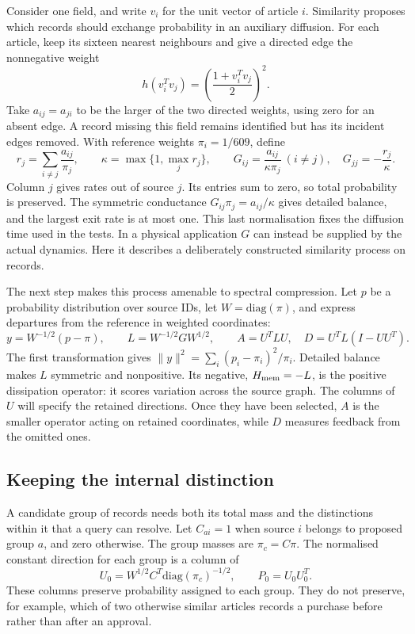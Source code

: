 Consider one field, and write $v_i$ for the unit vector of article $i$. Similarity proposes which records should exchange probability in an auxiliary diffusion. For each article, keep its sixteen nearest neighbours and give a directed edge the nonnegative weight
\[
 h(v_i^Tv_j)=\left(\frac{1+v_i^Tv_j}{2}\right)^2.
\]
Take $a_{ij}=a_{ji}$ to be the larger of the two directed weights, using zero for an absent edge. A record missing this field remains identified but has its incident edges removed. With reference weights $\pi_i=1/609$, define
\begin{equation}
 r_j=\sum_{i\ne j}\frac{a_{ij}}{\pi_j},\qquad
 \kappa=\max\{1,\max_j r_j\},\qquad
 G_{ij}=\frac{a_{ij}}{\kappa\pi_j}\ (i\ne j),\quad
 G_{jj}=-\frac{r_j}{\kappa}.
 \label{eq:memory-generator-construction}
\end{equation}
Column $j$ gives rates out of source $j$. Its entries sum to zero, so total probability is preserved. The symmetric conductance $G_{ij}\pi_j=a_{ij}/\kappa$ gives detailed balance, and the largest exit rate is at most one. This last normalisation fixes the diffusion time used in the tests. In a physical application $G$ can instead be supplied by the actual dynamics. Here it describes a deliberately constructed similarity process on records.

The next step makes this process amenable to spectral compression. Let $p$ be a probability distribution over source IDs, let $W=\mathrm{diag}(\pi)$, and express departures from the reference in weighted coordinates:
\begin{equation}
 y=W^{-1/2}(p-\pi),\qquad L=W^{-1/2}GW^{1/2},\qquad
 A=U^TLU,\quad D=U^TL(I-UU^T).
 \label{eq:memory-object}
\end{equation}
The first transformation gives $\|y\|^2=\sum_i(p_i-\pi_i)^2/\pi_i$. Detailed balance makes $L$ symmetric and nonpositive. Its negative, $H_{\rm mem}=-L$, is the positive dissipation operator: it scores variation across the source graph. The columns of $U$ will specify the retained directions. Once they have been selected, $A$ is the smaller operator acting on retained coordinates, while $D$ measures feedback from the omitted ones.

\subsection{Keeping the internal distinction}
A candidate group of records needs both its total mass and the distinctions within it that a query can resolve. Let $C_{ai}=1$ when source $i$ belongs to proposed group $a$, and zero otherwise. The group masses are $\pi_c=C\pi$. The normalised constant direction for each group is a column of
\[
 U_0=W^{1/2}C^T\mathrm{diag}(\pi_c)^{-1/2},\qquad P_0=U_0U_0^T .
\]
These columns preserve probability assigned to each group. They do not preserve, for example, which of two otherwise similar articles records a purchase before rather than after an approval.

